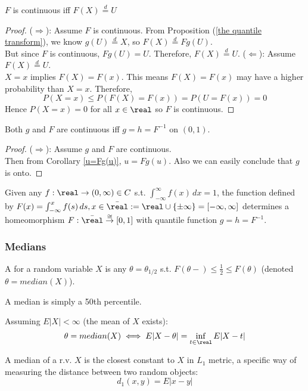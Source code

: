 \documentclass[11pt]{article}
\numberwithin{equation}{section}
\begin{document}
$F$ is continuous iff $F(X) \overset{d}{=} U$
\begin{proof}
	($\Rightarrow$): Assume $F$ is continuous. From Proposition (\ref{the quantile transform}), we know $g(U) \overset{d}{=}X$, so $F(X) \overset{d}{=} Fg(U)$. \\
	 But since $F$ is continuous, $Fg(U) = U$. Therefore, $F(X) \overset{d}{=} U$.
	($\Leftarrow$): Assume $F(X) \overset{d}{=} U$. \\
	$X = x$ implies $F(X) = F(x)$. This means $F(X) = F(x)$ may have a higher probability than $X=x$. Therefore,
	$$P(X=x) \leq P(F(X) = F(x)) = P(U = F(x)) = 0$$
	Hence $P(X = x) = 0$ for all $x \in \real$ so $F$ is continuous.
\end{proof}

\proposition
Both $g$ and $F$ are continuous iff $g = h = F^{-1}$ on $(0, 1)$.
\begin{proof}
	($\Rightarrow$): Assume $g$ and $F$ are continuous. \\
	Then from Corollary \ref{u=Fg(u)}, $u = Fg(u)$. Also we can easily conclude that $g$ is onto. 
\end{proof}
 
\property
Given any $f: \real \rightarrow (0, \infty) \in C$ s.t. $\int_{-\infty}^\infty f(x)\,dx =1$, the function defined by $F(x) = \int_{-\infty}^x f(s)\,ds, x \in \bar{\real} := \real \cup \{\pm \infty\} = [-\infty, \infty]$ determines a homeomorphism $F: \bar{\real} \overset{\cong}{\rightarrow} [0, 1]$ with quantile function $g = h = F^{-1}$.

\subsubsection{Medians}
 A  for a random variable $X$ is any $\theta = \theta_{1/2}$ s.t. $F(\theta-) \leq \frac{1}{2} \leq F(\theta)$ (denoted $\theta = median(X)$).

\remark
A median is simply a 50th percentile.

\proposition Assuming $E|X| < \infty$ (the mean of $X$ exists):
\begin{equation}
	\theta = median(X) \iff E|X - \theta| = \inf_{t\in\real} E|X-t|
\end{equation}

\remark
A median of a r.v. $X$ is the closest constant to $X$ in $L_1$ metric, a specific way of measuring the distance between two random objects:
$$d_1(x,y) = E|x - y|$$
\end{document}
